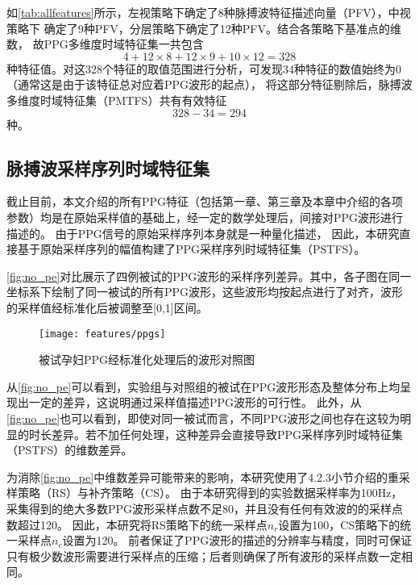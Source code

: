 如\autoref{tab:allfeatures}所示，左视策略下确定了8种脉搏波特征描述向量（PFV），中视策略下
确定了9种PFV，分层策略下确定了12种PFV。结合各策略下基准点的维数，
故PPG多维度时域特征集一共包含
\begin{equation*}
    \label{equ:fn0}
    4+12 \times 8+12 \times 9+10 \times 12=328 \nonumber
\end{equation*}
种特征值。对这328个特征的取值范围进行分析，可发现34种特征的数值始终为0（通常这是由于该特征总对应着PPG波形的起点），
将这部分特征剔除后，脉搏波多维度时域特征集（PMTFS）共有有效特征
\begin{equation}
    \label{equ:fn1}
    328-34=294 \nonumber
\end{equation}
种。

\subsection{脉搏波采样序列时域特征集}

截止目前，本文介绍的所有PPG特征（包括第一章、第三章及本章中介绍的各项参数）均是在原始采样值的基础上，经一定的数学处理后，间接对PPG波形进行描述的。
由于PPG信号的原始采样序列本身就是一种量化描述，
因此，本研究直接基于原始采样序列的幅值构建了PPG采样序列时域特征集（PSTFS）。

\autoref{fig:no_pe}对比展示了四例被试的PPG波形的采样序列差异。其中，各子图在同一坐标系下绘制了同一被试的所有PPG波形，这些波形均按起点进行了对齐，波形的采样值经标准化后被调整至[0,1]区间。

\begin{figure}[htbp]
    \centering
    \texttt{[image: features/ppgs]}
    \caption{\label{fig:no_pe}被试孕妇PPG经标准化处理后的波形对照图}
\end{figure}

从\autoref{fig:no_pe}可以看到，实验组与对照组的被试在PPG波形形态及整体分布上均呈现出一定的差异，这说明通过采样值描述PPG波形的可行性。
此外，从\autoref{fig:no_pe}也可以看到，即使对同一被试而言，不同PPG波形之间也存在这较为明显的时长差异。若不加任何处理，这种差异会直接导致PPG采样序列时域特征集（PSTFS）的维数差异。

为消除\autoref{fig:no_pe}中维数差异可能带来的影响，本研究使用了4.2.3小节介绍的重采样策略（RS）与补齐策略（CS）。
由于本研究得到的实验数据采样率为100Hz，采集得到的绝大多数PPG波形采样点数不足80，并且没有任何有效波的的采样点数超过120。
因此，本研究将RS策略下的统一采样点$n_r$设置为100，CS策略下的统一采样点$n_c$设置为120。
前者保证了PPG波形的描述的分辨率与精度，同时可保证只有极少数波形需要进行采样点的压缩；后者则确保了所有波形的采样点数一定相同。

